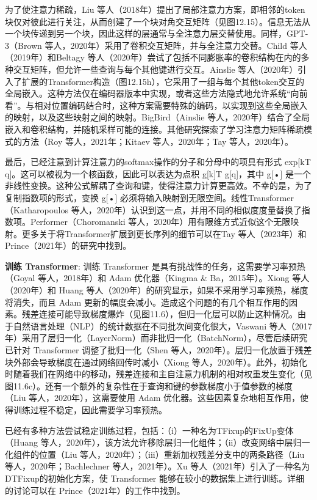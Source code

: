 为了使注意力稀疏，Liu 等人（2018年）提出了局部注意力方案，即相邻的token块仅对彼此进行关注，从而创建了一个块对角交互矩阵（见图12.15）。信息无法从一个块传递到另一个块，因此这样的层通常与全注意力层交替使用。同样，GPT-3（Brown 等人，2020年）采用了卷积交互矩阵，并与全注意力交替。Child 等人（2019年）和Beltagy 等人（2020年）尝试了包括不同膨胀率的卷积结构在内的多种交互矩阵，但允许一些查询与每个其他键进行交互。Ainslie 等人（2020年）引入了扩展的Transformer构造（图12.15h），它采用了一组与每个其他token交互的全局嵌入。这种方法仅在编码器版本中实现，或者这些方法隐式地允许系统“向前看”。与相对位置编码结合时，这种方案需要特殊的编码，以实现到这些全局嵌入的映射，以及这些映射之间的映射。BigBird（Ainslie 等人，2020年）结合了全局嵌入和卷积结构，并随机采样可能的连接。其他研究探索了学习注意力矩阵稀疏模式的方法（Roy 等人，2021年；Kitaev 等人，2020年；Tay 等人，2020年）。

最后，已经注意到计算注意力的softmax操作的分子和分母中的项具有形式 exp[kT q]。这可以被视为一个核函数，因此可以表达为点积 g[k]T g[q]，其中 g[•] 是一个非线性变换。这种公式解耦了查询和键，使得注意力计算更高效。不幸的是，为了复制指数项的形式，变换 g[•] 必须将输入映射到无限空间。线性Transformer（Katharopoulos 等人，2020年）认识到这一点，并用不同的相似度度量替换了指数项。Performer（Choromanski 等人，2020年）用有限维方式近似这个无限映射。更多关于将Transformer扩展到更长序列的细节可以在Tay 等人（2023年）和Prince（2021年）的研究中找到。

\textbf{训练 Transformer}: 训练 Transformer 是具有挑战性的任务，这需要学习率预热（Goyal 等人，2018年）和 Adam 优化器（Kingma \& Ba，2015年）。Xiong 等人（2020年）和 Huang 等人（2020年）的研究显示，如果不采用学习率预热，梯度将消失，而且 Adam 更新的幅度会减小。造成这个问题的有几个相互作用的因素。残差连接可能导致梯度爆炸（见图11.6），但归一化层可以防止这种情况。由于自然语言处理（NLP）的统计数据在不同批次间变化很大，Vaswani 等人（2017年）采用了层归一化（LayerNorm）而非批归一化（BatchNorm），尽管后续研究已针对 Transformer 调整了批归一化（Shen 等人，2020年）。层归一化放置于残差块外部会导致梯度在通过网络回传时减小（Xiong 等人，2020年）。此外，初始化时随着我们在网络中的移动，残差连接和主自注意力机制的相对权重发生变化（见图11.6c）。还有一个额外的复杂性在于查询和键的参数梯度小于值参数的梯度（Liu 等人，2020年），这需要使用 Adam 优化器。这些因素复杂地相互作用，使得训练过程不稳定，因此需要学习率预热。

已经有多种方法尝试稳定训练过程，包括：（i）一种名为TFixup的FixUp变体（Huang 等人，2020年），该方法允许移除层归一化组件；（ii）改变网络中层归一化组件的位置（Liu 等人，2020年）；（iii）重新加权残差分支中的两条路径（Liu 等人，2020年；Bachlechner 等人，2021年）。Xu 等人（2021年）引入了一种名为DTFixup的初始化方案，使 Transformer 能够在较小的数据集上进行训练。详细的讨论可以在 Prince（2021年）的工作中找到。

